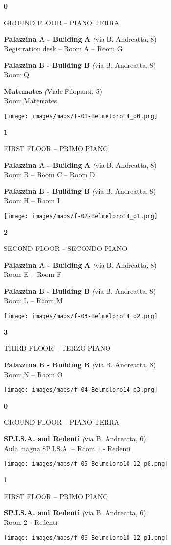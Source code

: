 \newcommand{\siammaptitle}[2]{\begin{siambuildingbox}\begin{center}\textbf{\Huge {#1}} \par \vspace{10pt} {\Large {#2}}\end{center}\end{siambuildingbox}}
\newcommand{\siammapbuilding}[3]{\begin{center}{\large \textbf{#1}} {\textit ({#3})} \\ {#2} \end{center}}

\siammaptitle{0}{GROUND FLOOR -- PIANO TERRA}
\siammapbuilding{Palazzina A - Building A}{Registration desk -- Room A -- Room G}{via B. Andreatta, 8}
\siammapbuilding{Palazzina B - Building B}{Room Q}{via B. Andreatta, 8}
\siammapbuilding{Matemates}{Room Matemates}{Viale Filopanti, 5}

\texttt{[image: images/maps/f-01-Belmeloro14\_p0.png]}

\newpage

\siammaptitle{1}{FIRST FLOOR -- PRIMO PIANO}
\siammapbuilding{Palazzina A - Building A}{Room B -- Room C -- Room D}{via B. Andreatta, 8}
\siammapbuilding{Palazzina B - Building B}{Room H -- Room I}{via B. Andreatta, 8}

\texttt{[image: images/maps/f-02-Belmeloro14\_p1.png]}

\newpage

\siammaptitle{2}{SECOND FLOOR -- SECONDO PIANO}
\siammapbuilding{Palazzina A - Building A}{Room E -- Room F}{via B. Andreatta, 8}
\siammapbuilding{Palazzina B - Building B}{Room L -- Room M}{via B. Andreatta, 8}

\texttt{[image: images/maps/f-03-Belmeloro14\_p2.png]}

\newpage

\siammaptitle{3}{THIRD FLOOR -- TERZO PIANO}
\siammapbuilding{Palazzina B - Building B}{Room N -- Room O}{via B. Andreatta, 8}

\texttt{[image: images/maps/f-04-Belmeloro14\_p3.png]}

\newpage

\siammaptitle{0}{GROUND FLOOR -- PIANO TERRA}
\siammapbuilding{SP.I.S.A. and Redenti}{Aula magna SP.I.S.A. -- Room 1 - Redenti}{via B. Andreatta, 6}

\texttt{[image: images/maps/f-05-Belmeloro10-12\_p0.png]}

\bigskip

\vspace{2cm}

\siammaptitle{1}{FIRST FLOOR -- PRIMO PIANO}
\siammapbuilding{SP.I.S.A. and Redenti}{Room 2 - Redenti}{via B. Andreatta, 6}

\texttt{[image: images/maps/f-06-Belmeloro10-12\_p1.png]}


